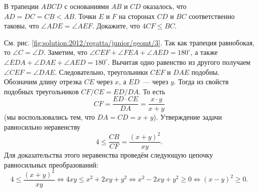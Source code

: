 В трапеции $ABCD$ с основаниями $AB$ и $CD$ оказалось, что $AD = DC = CB < AB$.
Точки $E$ и $F$ на сторонах $CD$ и $BC$ соответственно таковы, что
$\angle ADE = \angle AEF$.
Докажите, что $4 CF \leq BC$.

%
\label{solution:2012/regatta/junior/geomt/3}%
См. рис. \ref{fig:solution:2012/regatta/junior/geomt/3}.
Так как трапеция равнобокая, то $\angle C = \angle D$.
Заметим, что
$\angle CEF + \angle FEA + \angle AED = 180^\circ$, а также
$\angle EDA + \angle DAE + \angle AED = 180^\circ$.
Вычитая одно равенство из другого получаем $\angle CEF = \angle DAE$.
Следовательно, треугольники $CEF$ и $DAE$ подобны.
Обозначим длину отрезка $CE$ через $x$, а $ED$~--- через $y$.
Тогда из свойств подобных треугольников $CF / CE = ED / DA$.
То есть
\[
    CF = \frac{ED \cdot CE}{DA} = \frac{x \cdot y}{x + y}
\]
(мы воспользовались тем, что $DA = CD = x + y$).
Утверждение задачи равносильно неравенству
\[
    4 \leq \frac{CB}{CF} = \frac{(x + y)^2}{xy}
.\]
Для доказательства этого неравенства проведём следующую цепочку равносильных
преобразований:
\[
    4 \leq \frac{(x + y)^2}{xy}
\Leftrightarrow
    4 x y \leq x^2 + 2 x y + y^2
\Leftrightarrow
    x^2 - 2 x y + y^2 \geq 0
\Leftrightarrow
    (x - y)^2 \geq 0
.\]

